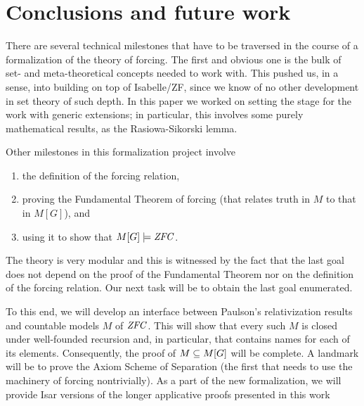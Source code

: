 \section{Conclusions and future work}
There are several technical milestones that have to be traversed in the
course of a formalization of the theory of forcing. The first and
obvious one is the bulk of set- and meta-theoretical concepts needed to work
with. This pushed us, in a sense,  into building on top of Isabelle/ZF,
since we know of no other development in set theory of such
depth. In this paper we worked on setting the stage for the work with
generic extensions; in particular, this involves some purely mathematical
results, as the Rasiowa-Sikorski lemma. 

Other milestones in this formalization project
involve 
\begin{enumerate}
\item the definition
  of the forcing relation, 
\item proving the Fundamental Theorem of forcing
  (that relates truth in $M$ to that in $M[G]$), and 
\item using it to show
  that $M[G]\models \mathit{ZFC}$. 
\end{enumerate}
The theory is very modular and this is
witnessed by the fact 
that the last goal does not depend on the proof of the Fundamental
Theorem nor on the definition of the forcing relation. Our next task
will be to obtain the last goal enumerated. 

To this end, we will develop  an interface between Paulson's
relativization results and countable models $M$ of $\mathit{ZFC}$. This will show
that every such $M$ is closed under well-founded recursion and, in
particular, that contains names for each of its
elements. Consequently, the proof of  $M\subseteq M[G]$ will be
complete. A landmark will be to prove the Axiom Scheme
of Separation (the first that needs to use the machinery of forcing
nontrivially). As a part of the new formalization, we will provide
Isar versions of the longer applicative proofs presented in this work

